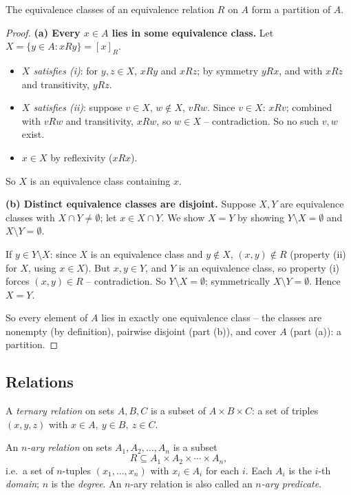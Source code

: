 \begin{theorem}
The equivalence classes of an equivalence relation $R$ on $A$ form a partition of $A$.
\end{theorem}
\begin{proof}
\textbf{(a) Every $x \in A$ lies in some equivalence class.} Let $X = \{y \in A : xRy\} = [x]_R$.
\begin{itemize}
    \item \emph{$X$ satisfies (i)}: for $y,z \in X$, $xRy$ and $xRz$; by symmetry $yRx$, and with $xRz$ and transitivity, $yRz$.
    \item \emph{$X$ satisfies (ii)}: suppose $v \in X$, $w \notin X$, $vRw$. Since $v \in X$: $xRv$; combined with $vRw$ and transitivity, $xRw$, so $w \in X$ -- contradiction. So no such $v,w$ exist.
    \item $x \in X$ by reflexivity ($xRx$).
\end{itemize}
So $X$ is an equivalence class containing $x$.

\textbf{(b) Distinct equivalence classes are disjoint.} Suppose $X,Y$ are equivalence classes with $X \cap Y \neq \emptyset$; let $x \in X \cap Y$. We show $X = Y$ by showing $Y \setminus X = \emptyset$ and $X \setminus Y = \emptyset$.

If $y \in Y \setminus X$: since $X$ is an equivalence class and $y \notin X$, $(x,y) \notin R$ (property (ii) for $X$, using $x \in X$). But $x,y \in Y$, and $Y$ is an equivalence class, so property (i) forces $(x,y) \in R$ -- contradiction. So $Y \setminus X = \emptyset$; symmetrically $X \setminus Y = \emptyset$. Hence $X = Y$.

So every element of $A$ lies in exactly one equivalence class -- the classes are nonempty (by definition), pairwise disjoint (part (b)), and cover $A$ (part (a)): a partition.
\end{proof}

\subsection{Relations}
\label{sec:2-17}

\begin{definition}
A \emph{ternary relation} on sets $A,B,C$ is a subset of $A \times B \times C$: a set of triples $(x,y,z)$ with $x\in A,\ y\in B,\ z\in C$.
\end{definition}

\begin{definition}
An \emph{$n$-ary relation} on sets $A_1,A_2,\dots,A_n$ is a subset
\[
R \subseteq A_1 \times A_2 \times \cdots \times A_n,
\]
i.e.\ a set of $n$-tuples $(x_1,\dots,x_n)$ with $x_i \in A_i$ for each $i$. Each $A_i$ is the $i$-th \emph{domain}; $n$ is the \emph{degree}. An $n$-ary relation is also called an \emph{$n$-ary predicate}.
\end{definition}

